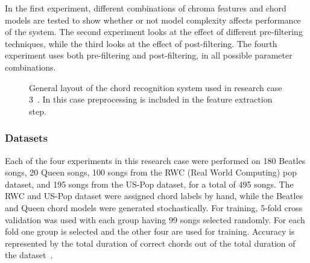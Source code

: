 \documentclass{sig-alternate}
\begin{document}
In the first experiment, different combinations of chroma features and chord models are tested to show whether or not model complexity affects performance of the system. The second experiment looks at the effect of different pre-filtering techniques, while the third looks at the effect of post-filtering. The fourth experiment uses both pre-filtering and post-filtering, in all possible parameter combinations.



\begin{figure}
\centering
{}
\caption{General layout of the chord recognition system used in research case 3~\cite{TaeMin:2014}. In this case preprocessing is included in the feature extraction step.}
\label{fig:fig3}
\end{figure}

\subsubsection{Datasets}

Each of the four experiments in this research case were performed on 180 Beatles songs, 20 Queen songs, 100 songs from the RWC (Real World Computing) pop dataset, and 195 songs from the US-Pop dataset, for a total of 495 songs. The RWC and US-Pop dataset were assigned chord labels by hand, while the Beatles and Queen chord models were generated stochastically. For training, 5-fold cross validation was used with each group having 99 songs selected randomly. For each fold one group is selected and the other four are used for training. Accuracy is represented by the total duration of correct chords out of the total duration of the dataset~\cite{TaeMin:2014}.
\end{document}
